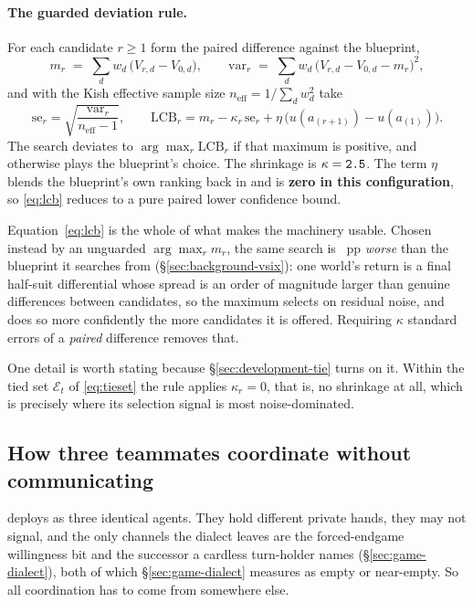 \paragraph{The guarded deviation rule.} For each candidate $r \ge 1$ form the paired difference
against the blueprint,
\begin{equation}
  m_r \;=\; \sum_{d} w_d\,\bigl(V_{r,d} - V_{0,d}\bigr),
  \qquad
  \mathrm{var}_r \;=\; \sum_{d} w_d\,\bigl(V_{r,d} - V_{0,d} - m_r\bigr)^2,
  \label{eq:paired}
\end{equation}
and with the Kish effective sample size $n_{\mathrm{eff}} = 1/\sum_d w_d^2$ take
\begin{equation}
  \mathrm{se}_r = \sqrt{\frac{\mathrm{var}_r}{n_{\mathrm{eff}} - 1}},
  \qquad
  \mathrm{LCB}_r = m_r - \kappa_r\,\mathrm{se}_r + \eta\,\bigl(u(a_{(r+1)}) - u(a_{(1)})\bigr).
  \label{eq:lcb}
\end{equation}
The search deviates to $\arg\max_r \mathrm{LCB}_r$ if that maximum is positive, and otherwise plays
the blueprint's choice. The shrinkage is $\kappa = \texttt{2.5{}}$. The term $\eta$ blends the blueprint's own
ranking back in and is \textbf{zero in this configuration}, so \eqref{eq:lcb} reduces to a pure
paired lower confidence bound.

Equation~\eqref{eq:lcb} is the whole of what makes the machinery usable. Chosen instead by an
unguarded $\arg\max_r m_r$, the same search is \vsixCurseGap{}~pp \emph{worse} than the blueprint it
searches from (\S\ref{sec:background-vsix}): one world's return is a final half-suit differential
whose spread is an order of magnitude larger than genuine differences between candidates, so the
maximum selects on residual noise, and does so more confidently the more candidates it is offered.
Requiring $\kappa$ standard errors of a \emph{paired} difference removes that.

One detail is worth stating because \S\ref{sec:development-tie} turns on it. Within the tied set
$\mathcal{E}_t$ of \eqref{eq:tieset} the rule applies $\kappa_r = 0$, that is, no shrinkage at all,
which is precisely where its selection signal is most noise-dominated.

\subsection{How three teammates coordinate without communicating}
\label{sec:agent-coordination}

\sestina{} deploys as three identical agents. They hold different private hands, they may not
signal, and the only channels the dialect leaves are the forced-endgame willingness bit and the
successor a cardless turn-holder names (\S\ref{sec:game-dialect}), both of which
\S\ref{sec:game-dialect} measures as empty or near-empty. So all coordination has to come from
somewhere else.

